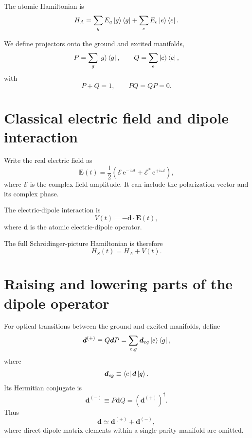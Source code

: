 \documentclass[11pt]{article}
\newcommand{\ee}{\mathrm{e}}
\newcommand{\ii}{\mathrm{i}}
\newcommand{\Hatom}{H_A}
\newcommand{\projG}{P}
\newcommand{\projE}{Q}
\begin{document}
The atomic Hamiltonian is
\begin{equation}
\Hatom
=
\sum_g E_g\ket{g}\bra{g}
+
\sum_e E_e\ket{e}\bra{e}.
\label{eq:HA}
\end{equation}

We define projectors onto the ground and excited manifolds,
\begin{equation}
\projG=\sum_g\ket{g}\bra{g},
\qquad
\projE=\sum_e\ket{e}\bra{e},
\label{eq:projectors}
\end{equation}
with
\begin{equation}
\projG+\projE=1,
\qquad
\projG\projE=\projE\projG=0.
\label{eq:PQ}
\end{equation}

\section{Classical electric field and dipole interaction}

Write the real electric field as
\begin{equation}
\bm E(t)
=
\frac{1}{2}
\left(
\bm{\mathcal E}\,\ee^{-\ii\omega t}
+
\bm{\mathcal E}^{*}\,\ee^{+\ii\omega t}
\right),
\label{eq:Efield}
\end{equation}
where $\bm{\mathcal E}$ is the complex field amplitude. It can include the polarization vector and its complex phase.

The electric-dipole interaction is
\begin{equation}
V(t)=-\bm d\cdot \bm E(t),
\label{eq:dipoleinteraction}
\end{equation}
where $\bm d$ is the atomic electric-dipole operator.

The full Schr\"odinger-picture Hamiltonian is therefore
\begin{equation}
H_S(t)=\Hatom+V(t).
\label{eq:HS}
\end{equation}

\section{Raising and lowering parts of the dipole operator}

For optical transitions between the ground and excited manifolds, define
\begin{equation}
\bm d^{(+)}
\equiv
\projE\bm d\projG
=
\sum_{e,g}
\bm d_{eg}\ket{e}\bra{g},
\label{eq:dplus}
\end{equation}
where
\begin{equation}
\bm d_{eg}
\equiv
\bra{e}\bm d\ket{g}.
\label{eq:deg}
\end{equation}
Its Hermitian conjugate is
\begin{equation}
\bm d^{(-)}
\equiv
\projG\bm d\projE
=
\left(\bm d^{(+)}\right)^\dagger.
\label{eq:dminus}
\end{equation}
Thus
\begin{equation}
\bm d\simeq \bm d^{(+)}+\bm d^{(-)},
\label{eq:ddecomp}
\end{equation}
where direct dipole matrix elements within a single parity manifold are omitted.
\end{document}
